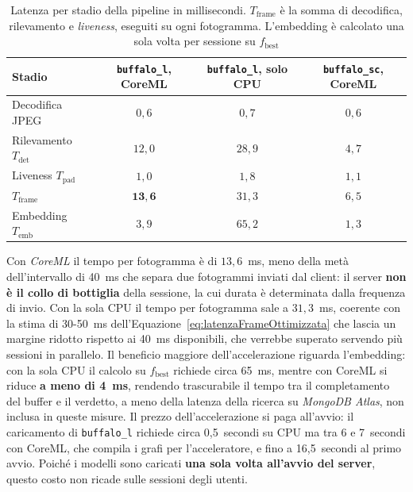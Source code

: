 \begin{table}[htbp]
    \centering
    \footnotesize
    \renewcommand{\arraystretch}{1.25}
    \begin{tabular*}{\textwidth}{@{\extracolsep{\fill}}lccc@{}}
        \hline
        \textbf{Stadio} & \textbf{\texttt{buffalo\_l}, CoreML} & \textbf{\texttt{buffalo\_l}, solo CPU} & \textbf{\texttt{buffalo\_sc}, CoreML} \\
        \hline
        Decodifica JPEG & $0{,}6$ & $0{,}7$ & $0{,}6$ \\
        Rilevamento $T_{\text{det}}$ & $12{,}0$ & $28{,}9$ & $4{,}7$ \\
        Liveness $T_{\text{pad}}$ & $1{,}0$ & $1{,}8$ & $1{,}1$ \\
        \textbf{$T_{\text{frame}}$} & $\mathbf{13{,}6}$ & $31{,}3$ & $6{,}5$ \\
        Embedding $T_{\text{emb}}$ & $3{,}9$ & $65{,}2$ & $1{,}3$ \\
        \hline
    \end{tabular*}
    \caption[Latenza per stadio della pipeline in millisecondi]{Latenza per stadio della pipeline in millisecondi. $T_{\text{frame}}$ è la somma di decodifica, rilevamento e \textit{liveness}, eseguiti su ogni fotogramma. L'embedding è calcolato una sola volta per sessione su $f_{\text{best}}$}
    \label{tab:latenzePerStadio}
\end{table}
Con \textit{CoreML} il tempo per fotogramma è di $13{,}6$~ms, meno della metà dell'intervallo di 40~ms che separa due fotogrammi inviati dal client: il server \textbf{non è il collo di bottiglia} della sessione, la cui durata è determinata dalla frequenza di invio.
Con la sola CPU il tempo per fotogramma sale a $31{,}3$~ms, coerente con la stima di 30-50~ms dell'Equazione~\eqref{eq:latenzaFrameOttimizzata} che lascia un margine ridotto rispetto ai 40~ms disponibili, che verrebbe superato servendo più sessioni in parallelo.
Il beneficio maggiore dell'accelerazione riguarda l'embedding: con la sola CPU il calcolo su $f_{\text{best}}$ richiede circa 65~ms, mentre con CoreML si riduce \textbf{a meno di 4~ms}, rendendo trascurabile il tempo tra il completamento del buffer e il verdetto, a meno della latenza della ricerca su \textit{MongoDB Atlas}, non inclusa in queste misure.
Il prezzo dell'accelerazione si paga all'avvio: il caricamento di \texttt{buffalo\_l} richiede circa 0,5~secondi su CPU ma tra 6 e 7~secondi con CoreML, che compila i grafi per l'acceleratore, e fino a 16,5~secondi al primo avvio. Poiché i modelli sono caricati \textbf{una sola volta all'avvio del server}, questo costo non ricade sulle sessioni degli utenti.


